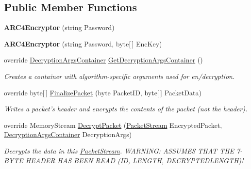 \subsection*{Public Member Functions}
\begin{DoxyCompactItemize}
\item 
\hypertarget{class_gonzo_net_1_1_encryption_1_1_a_r_c4_encryptor_a9f7b69d547e80825b0d930bb6bf22205}{{\bfseries A\+R\+C4\+Encryptor} (string Password)}\label{class_gonzo_net_1_1_encryption_1_1_a_r_c4_encryptor_a9f7b69d547e80825b0d930bb6bf22205}

\item 
\hypertarget{class_gonzo_net_1_1_encryption_1_1_a_r_c4_encryptor_a778c1bf8c302403bbaaad5002683bfd2}{{\bfseries A\+R\+C4\+Encryptor} (string Password, byte\mbox{[}$\,$\mbox{]} Enc\+Key)}\label{class_gonzo_net_1_1_encryption_1_1_a_r_c4_encryptor_a778c1bf8c302403bbaaad5002683bfd2}

\item 
override \hyperlink{class_gonzo_net_1_1_encryption_1_1_decryption_args_container}{Decryption\+Args\+Container} \hyperlink{class_gonzo_net_1_1_encryption_1_1_a_r_c4_encryptor_a1b507d8d51de20cb5d976aedfadd3a02}{Get\+Decryption\+Args\+Container} ()
\begin{DoxyCompactList}\small\item\em Creates a container with algorithm-\/specific arguments used for en/decryption. \end{DoxyCompactList}\item 
override byte\mbox{[}$\,$\mbox{]} \hyperlink{class_gonzo_net_1_1_encryption_1_1_a_r_c4_encryptor_aa9e40509c8a1a7d0405378dc20240fff}{Finalize\+Packet} (byte Packet\+I\+D, byte\mbox{[}$\,$\mbox{]} Packet\+Data)
\begin{DoxyCompactList}\small\item\em Writes a packet's header and encrypts the contents of the packet (not the header). \end{DoxyCompactList}\item 
override Memory\+Stream \hyperlink{class_gonzo_net_1_1_encryption_1_1_a_r_c4_encryptor_a48b310cd4874537e10703c566a3dafa7}{Decrypt\+Packet} (\hyperlink{class_gonzo_net_1_1_packet_stream}{Packet\+Stream} Encrypted\+Packet, \hyperlink{class_gonzo_net_1_1_encryption_1_1_decryption_args_container}{Decryption\+Args\+Container} Decryption\+Args)
\begin{DoxyCompactList}\small\item\em Decrypts the data in this \hyperlink{class_gonzo_net_1_1_packet_stream}{Packet\+Stream}. W\+A\+R\+N\+I\+N\+G\+: A\+S\+S\+U\+M\+E\+S T\+H\+A\+T T\+H\+E 7-\/\+B\+Y\+T\+E H\+E\+A\+D\+E\+R H\+A\+S B\+E\+E\+N R\+E\+A\+D (I\+D, L\+E\+N\+G\+T\+H, D\+E\+C\+R\+Y\+P\+T\+E\+D\+L\+E\+N\+G\+T\+H)! \end{DoxyCompactList}\end{DoxyCompactItemize}
